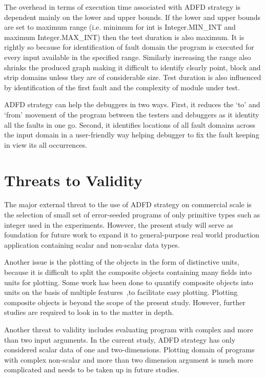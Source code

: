 The overhead in terms of execution time associated with ADFD strategy is dependent mainly on the lower and upper bounds. If the lower and upper bounds are set to maximum range (i.e. minimum for int is Integer.MIN\_INT and maximum Integer.MAX\_INT) then the test duration is also maximum. It is rightly so because for identification of fault domain the program is executed for every input available in the specified range. Similarly increasing the range also shrinks the produced graph making it difficult to identify clearly point, block and strip domains unless they are of considerable size. Test duration is also influenced by identification of the first fault and the complexity of module under test.

ADFD strategy can help the debuggers in two ways. First, it reduces the `to' and `from' movement of the program between the testers and debuggers as it identity all the faults in one go. Second, it identifies locations of all fault domains across the input domain in a user-friendly way helping debugger to fix the fault keeping in view its all occurrences.


\section{Threats to Validity} \label{sec:validity}
The major external threat to the use of ADFD strategy on commercial scale is the selection of small set of error-seeded programs of only primitive types such as integer used in the experiments. However, the present study will serve as foundation for future work to expand it to general-purpose real world production application containing scalar and non-scalar data types.

Another issue is the plotting of the objects in the form of distinctive units, because it is difficult to split the composite objects containing many fields into units for plotting. Some work has been done to quantify composite objects into units on the basis of multiple features~\cite{Ciupa2006},to facilitate easy plotting. Plotting composite objects is beyond the scope of the present study. However, further studies are required to look in to the matter in depth. 

Another threat to validity includes evaluating program with complex and more than two input arguments. In the current study, ADFD strategy has only considered scalar data of one and two-dimensions. Plotting domain of programs with complex non-scalar and more than two dimension argument is much more complicated and needs to be taken up in future studies.

